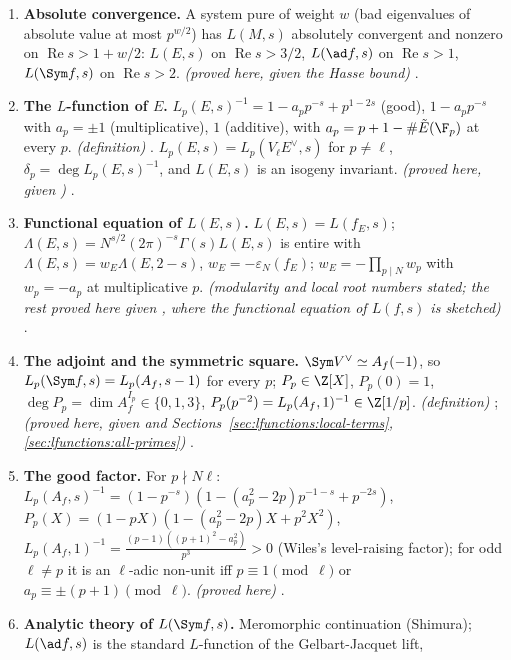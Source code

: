 \begin{enumerate}[label=\textbf{\thechapter.\arabic*}]
$V_\ell E$, for every tensor construction from it and for $V_\lambda(f)$. \emph{(definition; stated)} ,
.
\item \textbf{Absolute convergence.} A system pure of weight $w$ (bad eigenvalues of absolute value at most $p^{w/2}$) has $L(M,s)$ absolutely convergent and
nonzero on $\operatorname{Re}s>1+w/2$: $L(E,s)$ on $\operatorname{Re}s>3/2$, $L(\ad f,s)$ on $\operatorname{Re}s>1$, $L(\Sym f,s)$ on $\operatorname{Re}s>2$. \emph{(proved here, given
the Hasse bound)} .
\item \textbf{The $L$-function of $E$.} $L_p(E,s)^{-1}=1-a_pp^{-s}+p^{1-2s}$ (good), $1-a_pp^{-s}$ with $a_p=\pm1$ (multiplicative), $1$ (additive), with
$a_p=p+1-\#\tilde E(\F_p)$ at every $p$. \emph{(definition)} . $L_p(E,s)=L_p(V_\ell E^\vee,s)$ for $p\ne\ell$, $\delta_p=\deg L_p(E,s)^{-1}$, and
$L(E,s)$ is an isogeny invariant. \emph{(proved here, given )} .
\item \textbf{Functional equation of $L(E,s)$.} $L(E,s)=L(f_E,s)$; $\Lambda(E,s)=N^{s/2}(2\pi)^{-s}\Gamma(s)L(E,s)$ is entire with $\Lambda(E,s)=w_E\Lambda(E,2-s)$,
$w_E=-\varepsilon_N(f_E)$; $w_E=-\prod_{p\mid N}w_p$ with $w_p=-a_p$ at multiplicative $p$. \emph{(modularity and local root numbers stated; the rest
proved here given , where the functional equation of $L(f,s)$ is sketched)} .
\item \textbf{The adjoint and the symmetric square.} $\Sym V^\vee\simeq A_f(-1)$, so $L_p(\Sym f,s)=L_p(A_f,s-1)$ for every $p$; $P_p\in\Z[X]$, $P_p(0)=1$,
$\deg P_p=\dim A_f^{I_p}\in\{0,1,3\}$, $P_p(p^{-2})=L_p(A_f,1)^{-1}\in\Z[1/p]$. \emph{(definition)} ; \emph{(proved here, given
 and Sections~\ref{sec:lfunctions:local-terms}, \ref{sec:lfunctions:all-primes})} .
\item \textbf{The good factor.} For $p\nmid N\ell$: $L_p(A_f,s)^{-1}=(1-p^{-s})(1-(a_p^2-2p)p^{-1-s}+p^{-2s})$, $P_p(X)=(1-pX)(1-(a_p^2-2p)X+p^2X^2)$,
$L_p(A_f,1)^{-1}=\frac{(p-1)((p+1)^2-a_p^2)}{p^3}>0$ (Wiles's level-raising factor); for odd $\ell\ne p$ it is an $\ell$-adic non-unit iff $p\equiv1\pmod\ell$ or
$a_p\equiv\pm(p+1)\pmod\ell$. \emph{(proved here)} .
\item \textbf{Analytic theory of $L(\Sym f,s)$.} Meromorphic continuation (Shimura); $L(\ad f,s)$ is the standard $L$-function of the Gelbart-Jacquet lift,

\end{enumerate}
